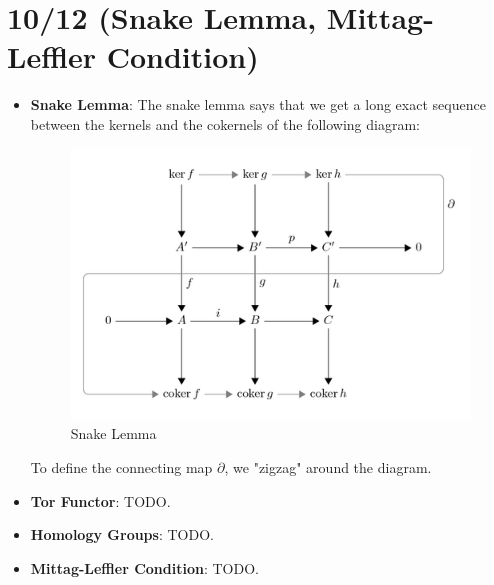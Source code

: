 \documentclass[11pt, oneside]{amsart}   	%
\theoremstyle{definition}
\begin{document}
\section{10/12 (Snake Lemma, Mittag-Leffler Condition)}

\begin{itemize}

	\item \textbf{Snake Lemma}: The snake lemma says that we get a long exact sequence between the kernels and the cokernels of the following 
	diagram:
	
	\begin{figure}[H]
		\centering
		\includegraphics[width = .6\textwidth]{snake_lemma}
		\caption{Snake Lemma}
	\end{figure}
	
	To define the connecting map $\partial$, we "zigzag" around the diagram.
	
	\item \textbf{Tor Functor}: TODO.
	
	\item \textbf{Homology Groups}: TODO.
	
	\item \textbf{Mittag-Leffler Condition}: TODO.

\end{itemize}
\end{document}
